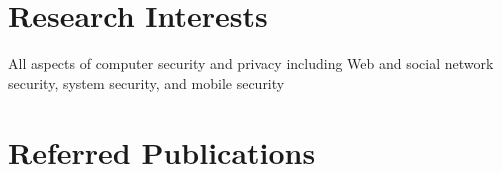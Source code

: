 \documentclass[letterpaper]{article}
\renewenvironment{itemize}{
  \begin{list}{}{
    \setlength{\leftmargin}{1.5em}
  }
}{
  \end{list}
}
\begin{document}
\section*{Research Interests}
All aspects of computer security and privacy including Web and social network security, system security, and mobile security

\section*{Referred Publications}

%
\end{document}

